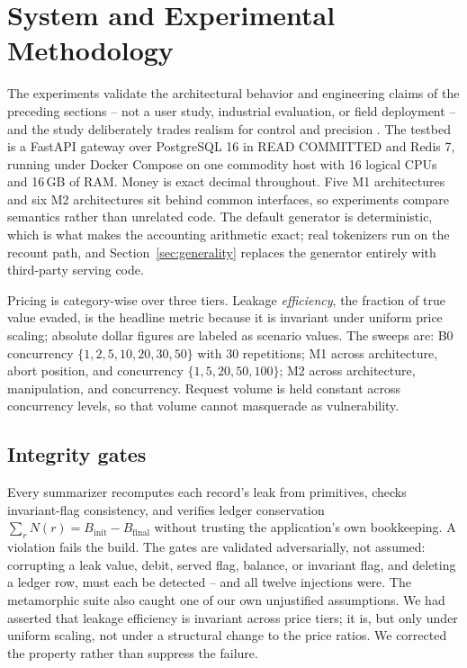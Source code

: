 \documentclass[manuscript,review]{acmart}
\begin{document}
\section{System and Experimental Methodology}
\label{sec:method}
The experiments validate the architectural behavior and engineering claims of the
preceding sections -- not a user study, industrial evaluation, or field deployment -- and
the study deliberately trades realism for control and precision \citep{abc}. The testbed is a FastAPI gateway over PostgreSQL 16 in READ COMMITTED and Redis 7,
running under Docker Compose on one commodity host with 16 logical CPUs and 16\,GB of
RAM. Money is exact decimal throughout. Five M1 architectures and six M2 architectures
sit behind common interfaces, so experiments compare semantics rather than unrelated
code. The default generator is deterministic, which is what makes the accounting
arithmetic exact; real tokenizers run on the recount path, and
Section~\ref{sec:generality} replaces the generator entirely with third-party serving
code.

Pricing is category-wise over three tiers. Leakage \emph{efficiency}, the fraction of
true value evaded, is the headline metric because it is invariant under uniform price
scaling; absolute dollar figures are labeled as scenario values. The sweeps are: B0
concurrency $\{1,2,5,10,20,30,50\}$ with 30 repetitions; M1 across architecture, abort
position, and concurrency $\{1,5,20,50,100\}$; M2 across architecture, manipulation, and
concurrency. Request volume is held constant across concurrency levels, so that volume
cannot masquerade as vulnerability.

\subsection{Integrity gates}
Every summarizer recomputes each record's leak from primitives, checks invariant-flag
consistency, and verifies ledger conservation $\sum_r N(r) = B_{\mathrm{init}} -
B_{\mathrm{final}}$ without trusting the application's own bookkeeping. A violation fails
the build. The gates are validated adversarially, not assumed: corrupting a leak value,
debit, served flag, balance, or invariant flag, and deleting a ledger row, must each be
detected -- and all twelve injections were. The metamorphic suite also caught
one of our own unjustified assumptions. We had asserted that leakage efficiency is
invariant across price tiers; it is, but only under uniform scaling, not under a
structural change to the price ratios. We corrected the property rather than suppress the
failure.
\end{document}
